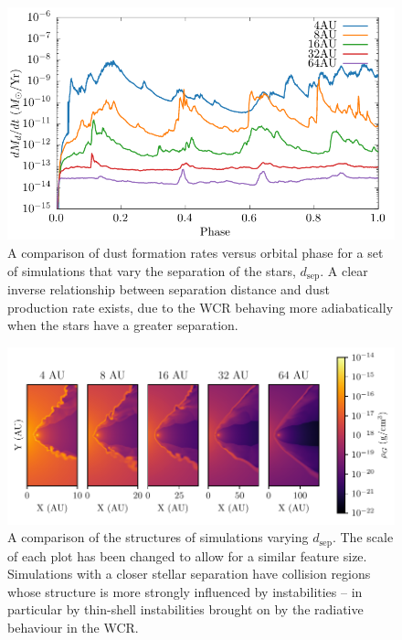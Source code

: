 \documentclass[fleqn,usenatbib]{mnras}
\begin{document}
\begin{figure}
  \centering
  \includegraphics[width=\linewidth]{assets/dsep-phase-dust_rate.pdf}
  \caption[Dust formation rate versus binary separation distance]{A comparison of dust formation rates versus orbital phase for a set of simulations that vary the separation of the stars, $d_\text{sep}$. A clear inverse relationship between separation distance and dust production rate exists, due to the WCR behaving more adiabatically when the stars have a greater separation.}
  \label{fig:dsepdustproduction}
\end{figure}

\begin{figure}
  \centering
  \includegraphics{assets/adiabatic-flow/instab-comp-rho.pdf}
  \caption[A comparison of the structures of simulations varying $d_\text{sep}$]{A comparison of the structures of simulations varying $d_\text{sep}$. The scale of each plot has been changed to allow for a similar feature size. Simulations with a closer stellar separation have collision regions whose structure is more strongly influenced by instabilities -- in particular by thin-shell instabilities brought on by the radiative behaviour in the WCR.}
  \label{fig:dsepinstabilities}
\end{figure}
\end{document}
